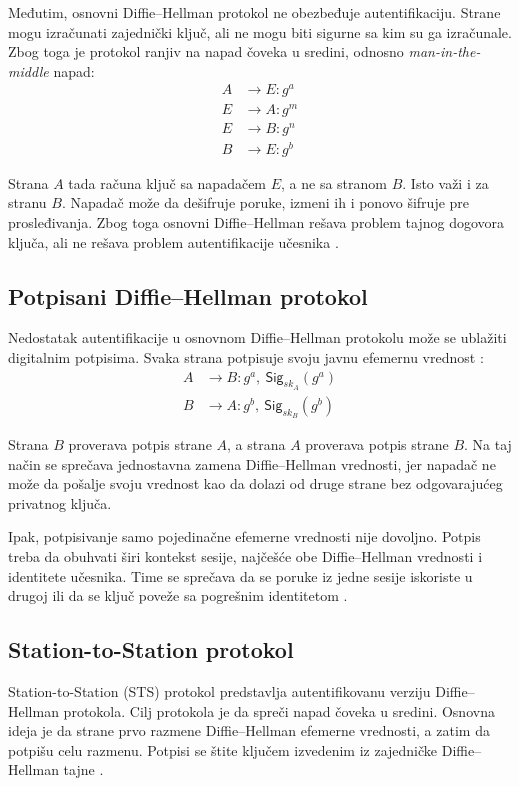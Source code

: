 Međutim, osnovni Diffie--Hellman protokol ne obezbeđuje autentifikaciju. Strane mogu izračunati zajednički ključ, ali ne mogu biti sigurne sa kim su ga izračunale. Zbog toga je protokol ranjiv na napad čoveka u sredini, odnosno \emph{man-in-the-middle} napad:
\[
\begin{aligned}
A &\rightarrow E : g^a \\
E &\rightarrow A : g^m \\
E &\rightarrow B : g^n \\
B &\rightarrow E : g^b
\end{aligned}
\]

Strana \(A\) tada računa ključ sa napadačem \(E\), a ne sa stranom \(B\). Isto važi i za stranu \(B\). Napadač može da dešifruje poruke, izmeni ih i ponovo šifruje pre prosleđivanja. Zbog toga osnovni Diffie--Hellman rešava problem tajnog dogovora ključa, ali ne rešava problem autentifikacije učesnika \cite{smart2016cryptography,stallings2011cryptography}.


\subsection{Potpisani Diffie--Hellman protokol}

Nedostatak autentifikacije u osnovnom Diffie--Hellman protokolu može se ublažiti digitalnim potpisima. Svaka strana potpisuje svoju javnu efemernu vrednost \cite{smart2016cryptography}:
\[
\begin{aligned}
A &\rightarrow B : g^a,\ \mathsf{Sig}_{sk_A}(g^a) \\
B &\rightarrow A : g^b,\ \mathsf{Sig}_{sk_B}(g^b)
\end{aligned}
\]

Strana \(B\) proverava potpis strane \(A\), a strana \(A\) proverava potpis strane \(B\). Na taj način se sprečava jednostavna zamena Diffie--Hellman vrednosti, jer napadač ne može da pošalje svoju vrednost kao da dolazi od druge strane bez odgovarajućeg privatnog ključa.

Ipak, potpisivanje samo pojedinačne efemerne vrednosti nije dovoljno. Potpis treba da obuhvati širi kontekst sesije, najčešće obe Diffie--Hellman vrednosti i identitete učesnika. Time se sprečava da se poruke iz jedne sesije iskoriste u drugoj ili da se ključ poveže sa pogrešnim identitetom \cite{smart2016cryptography}.

\subsection{Station-to-Station protokol}
Station-to-Station (STS) protokol predstavlja autentifikovanu verziju Diffie--Hellman protokola. Cilj protokola je da spreči napad čoveka u sredini. Osnovna ideja je da strane prvo razmene Diffie--Hellman efemerne vrednosti, a zatim da potpišu celu razmenu. Potpisi se štite ključem izvedenim iz zajedničke Diffie--Hellman tajne \cite{smart2016cryptography}.

